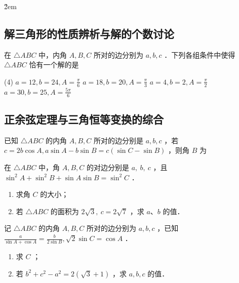 \v{2em}

\subsection{解三角形的性质辨析与解的个数讨论}

\begin{example}
    在 $\triangle A B C$ 中，内角 $A, B, C$ 所对的边分别为 $a, b, c$ ．下列各组条件中使得 $\triangle A B C$ 恰有一个解的是
    \begin{tasks}(4)
        \task $a=12, b=24, A=\frac{\pi}{6}$
        \task $a=18, b=20, A=\frac{\pi}{3}$
        \task $a=4, b=2, A=\frac{\pi}{2}$
        \task $a=30, b=25, A=\frac{5 \pi}{6}$
    \end{tasks}
\end{example}
\vspace{4em}

\subsection{正余弦定理与三角恒等变换的综合}

\begin{example}
    已知 $\triangle A B C$ 的内角 $A, B, C$ 所对的边分别是 $a, b, c$ ，若 $c=2 b \cos A, a \sin A-b \sin B=c(\sin C-\sin B)$ ，则角 $B$ 为
\end{example}
\vspace{4em}

\begin{example}
    在 $\triangle A B C$ 中，角 $A, B, C$ 的对边分别是 $a, ~ b, ~ c$ ，且 $\sin ^2 A+\sin ^2 B+\sin A \sin B=\sin ^2 C$ ．
    \begin{enumerate}
        \item 求角 $C$ 的大小；
        \item 若 $\triangle A B C$ 的面积为 $2 \sqrt{3}, ~ c=2 \sqrt{7}$ ，求 $a 、 b$ 的值．
    \end{enumerate}
\end{example}
\vspace{4em}

\begin{example}
    记 $\triangle A B C$ 的内角 $A, B, C$ 所对的边分别为 $a, b, c$ ，已知 $\frac{a}{\sin A+\cos A}=\frac{b}{2 \sin B}, \sqrt{2} \sin C=\cos A$ ．
    \begin{enumerate}
        \item 求 $C$ ；
        \item 若 $b^2+c^2-a^2=2(\sqrt{3}+1)$ ，求 $a, b, c$ 的值．
    \end{enumerate}
\end{example}
\vspace{4em}

